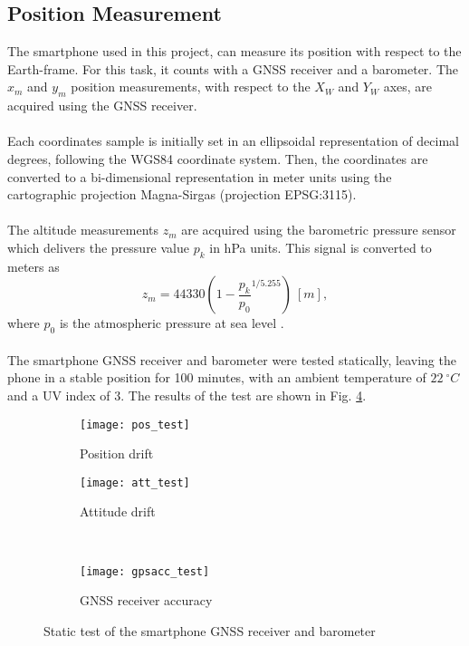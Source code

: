 \subsection{Position Measurement}
The smartphone used in this project, can measure its position with respect to the Earth-frame. For this task, it counts with a GNSS receiver and a barometer.
The $x_{m}$ and $y_{m}$ position measurements, with respect to the $X_W$ and $Y_W$ axes, are acquired using the GNSS receiver. 
\\\\
Each coordinates sample is initially set in an ellipsoidal representation of decimal degrees, following the WGS84 coordinate system. Then, the coordinates are converted to a bi-dimensional representation in meter units using the cartographic projection Magna-Sirgas (projection EPSG:3115).
\\\\
The altitude measurements $z_{m}$ are acquired using the barometric pressure sensor which delivers the pressure value $p_k$ in hPa units. This signal is converted to meters as
\begin{equation}\label{eqn:hbarom}
z_{m} = 44330\left(1-\frac{p_k}{p_{0}}^{1/5.255}\right)\ [m],
\end{equation}
where $p_{0}$ is the atmospheric pressure at sea level \cite{Lauszus2015}.
\\\\
The smartphone GNSS receiver and barometer were tested statically, leaving the phone in a stable position for 100 minutes, with an ambient temperature of $22\ ^{\circ}C$ and a UV index of $3$. The results of the test are shown in Fig. \ref{fig:sensorstest}.
\begin{figure}[h]
\begin{subfigure}{.5\linewidth}
\centering
\texttt{[image: pos\_test]}
\caption{Position drift}
\label{fig:pos_test}
\end{subfigure}%
\begin{subfigure}{.5\linewidth}
\centering
\texttt{[image: att\_test]}
\caption{Attitude drift}
\label{fig:att_test}
\end{subfigure}\\[1ex]
\begin{subfigure}{\linewidth}
\centering
\texttt{[image: gpsacc\_test]}
\caption{GNSS receiver accuracy}
\label{fig:gpsacc_test}
\end{subfigure}
\caption{Static test of the smartphone GNSS receiver and barometer}
\label{fig:sensorstest}
\end{figure}
